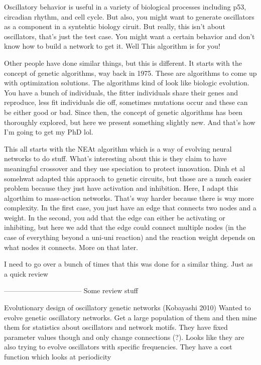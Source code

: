\documentclass[12pt]{report}
\begin{document}
Oscillatory behavior is useful in a variety of biological processes including p53, circadian rhythm, and cell cycle. But also, you might want to generate oscillators as a component in a syntehtic biology ciruit. But really, this isn't about oscillators, that's just the test case. You might want a certain behavior and don't know how to build a  network to get it. Well This algorithm is for you! 

Other people have done similar things, but this is different. It starts with the concept of genetic algorithms, way back in 1975. These are algorithms to come up with optimization solutions. The algorithms kind of look like biologic evolution. You have a bunch of individuals, the fitter individuals share their genes and reproduce, less fit individuals die off, sometimes mutations occur and these can be either good or bad. Since then, the concept of genetic algorithms has been thoroughly explored, but here we present something slightly new. And that's how I'm going to get my PhD lol.

This all starts with the NEAt algorithm which is a way of evolving neural networks to do stuff.  What's interesting about this is they claim to have meaningful crossover and they use speciation to protect innovation. Dinh et al somehwat adapted this appraoch to genetic circuits, but those are a much easier problem because they just have activation and inhibition. Here, I adapt this algorthim to mass-action networks. That's way harder because there is way more complexity. In the first case, you just have an edge that connects two nodes and a weight. In the second, you add that the edge can either be activating or inhibiting, but here we add that the edge could connect multiple nodes (in the case of everything beyond a uni-uni reaction) and the reaction weight depends on what nodes it connects. More on that later.

I need to go over a bunch of times that this was done for a similar thing. Just as a quick review


---------------------------------
Some review stuff


Evolutionary design of oscillatory genetic networks (Kobayashi 2010)
Wanted to evolve genetic oscillatory networks. Get a large population of them and then mine them for statistics about oscillators and network motifs. They have fixed parameter values though and only change connections (?). Looks like they are also trying to evolve oscillators with specific frequencies. They have a cost function which looks at periodicity
\end{document}
